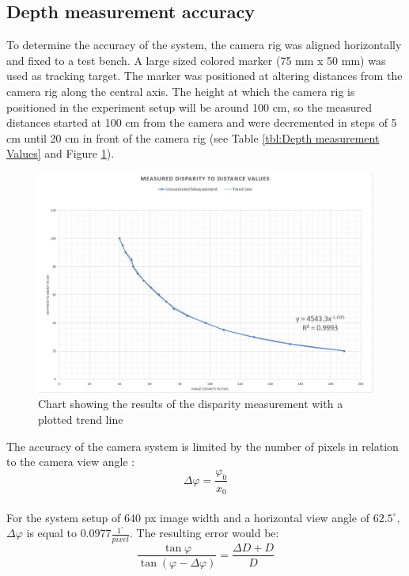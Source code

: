 \subsection{Depth measurement accuracy}
To determine the accuracy of the system, the camera rig was aligned horizontally and fixed to a test bench. A large sized colored marker (75 mm x 50 mm) was used as tracking target. The marker was positioned at altering distances from the camera rig along the central axis. The height at which the camera rig is positioned in the experiment setup will be around 100 cm, so the measured distances started at 100 cm from the camera and were decremented in steps of 5 cm until 20 cm in front of the camera rig (see Table \ref{tbl:Depth measurement Values} and Figure \ref{char:DisparityToDistanceChart}).\\
\begin{figure}[H]
\includegraphics[width=\textwidth]{images/Disparity_to_distance.JPG}
\caption{Chart showing the results of the disparity measurement with a plotted trend line}
\label{char:DisparityToDistanceChart} 
\end{figure}
The accuracy of the camera system is limited by the number of pixels in relation to the camera view angle \cite{JernejMrovlje.2008}:\\
\begin{equation}
\Delta\varphi=\frac{\varphi_0}{x_0}
\end{equation}
\\
For the system setup of 640 px image width and a horizontal view angle of $62.5^\circ$, $\Delta\varphi$ is equal to $0.0977\frac{1^\circ}{pixel}$.
The resulting error would be:\\
\begin{equation}
\frac{\tan \varphi}{\tan(\varphi -\Delta\varphi)}=\frac{\Delta D+D}{D}
\end{equation}\\
